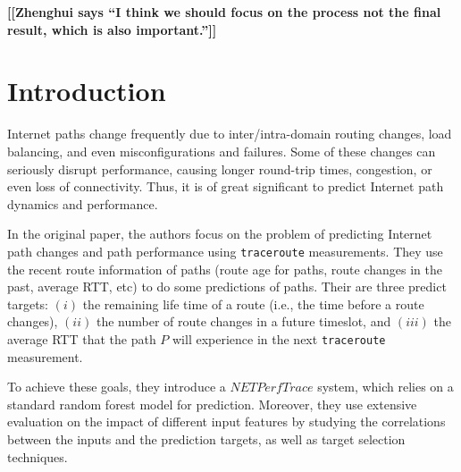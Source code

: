 \documentclass[sigconf]{acmart}
\newcommand{\hui}[1]{{\bf \color{purple} [[Zhenghui says ``#1'']]}}
\begin{document}




  \maketitle
 
\hui{I think we should focus on the process not the final result, which is also important.}
 
\section{Introduction}
Internet paths change frequently due to inter/intra-domain routing changes, load balancing, and even misconfigurations and failures\cite{1}.
Some of these changes can seriously disrupt performance, causing longer round-trip times, congestion, or even loss of connectivity\cite{2}.
Thus, it is of great significant to predict Internet path dynamics and performance.

In the original paper, the authors focus on the problem of predicting Internet path changes and path performance using \texttt{traceroute} measurements. They use the recent route information of paths (route age for paths, route changes in the past, average RTT, etc) to do some predictions of paths. Their are three predict targets: $(i)$ the remaining life time of a route (i.e., the time before a route changes), $(ii)$ the number of route changes in a future timeslot, and $(iii)$ the average RTT  that the path $P$ will experience in the next \texttt{traceroute} measurement.
 
To achieve these goals, they introduce a $NETPerfTrace$ system, which relies on a standard random forest model for prediction. Moreover, they use extensive evaluation on the impact of different input features by studying the correlations between the inputs and the prediction targets, as well as target selection techniques.
\end{document}
